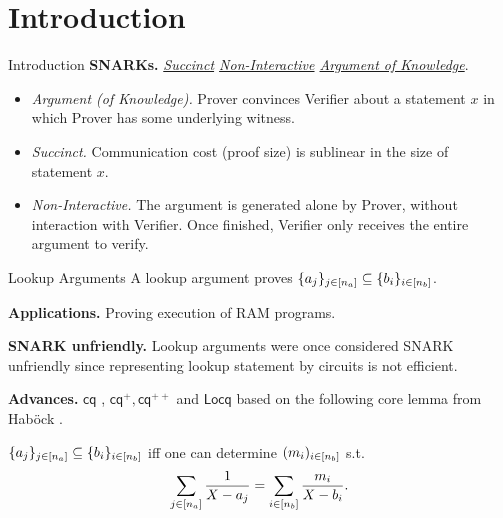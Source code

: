 \section{Introduction}
\begin{frame}{Introduction}
	\textbf{SNARKs.} \textit{\underline{Succinct} \underline{Non-Interactive} \underline{Argument of Knowledge}}.
	\begin{itemize}
		\item \textit{Argument (of Knowledge).} Prover convinces Verifier about a statement $x$ in which Prover has some underlying witness.
		\item \textit{Succinct.} Communication cost (proof size) is sublinear in the size of statement $x$.
		\item \textit{Non-Interactive.} The argument is generated alone by Prover, without interaction with Verifier. Once finished, Verifier only receives the entire argument to verify.
	\end{itemize}
\end{frame}
\begin{frame}{Lookup Arguments}
	A lookup argument \cite{AC:BCGJM18} proves $\{a_j\}_{j \in [{n_a}]} \subseteq \{b_i\}_{i \in [{n_b}]}$.
	
	\textbf{Applications.} Proving execution of RAM programs.
	
	\textbf{SNARK unfriendly.} Lookup arguments were once considered SNARK unfriendly since representing lookup statement by circuits is not efficient.
	
	\textbf{Advances.}  $\mathsf{cq}$ \cite{EPRINT:EagFioGab22}, $\mathsf{cq}^+, \mathsf{cq}^{++}$ \cite{PKC:CFFLL24} and $\mathsf{Locq}$ \cite{PKC:ZSG24} based on the following core lemma from Hab{\"o}ck \cite{EPRINT:Habock22b}.
	\begin{lemma}
		$\{a_j\}_{j \in [{n_a}]} \subseteq \{b_i\}_{i \in [{n_b}]}$ iff one can determine $(m_i)_{i \in [{n_b}]}$ s.t.
		\begin{equation*}
			\sum_{j \in [{n_a}]}\frac{1}{X - a_j} = \sum_{i \in [{n_b}]}\frac{m_i}{X - b_i}.
		\end{equation*}
	\end{lemma}
\end{frame}

